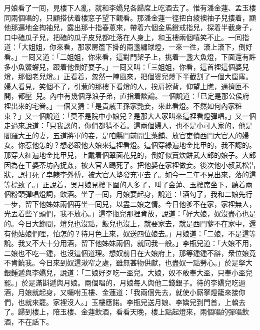 月娘看了一囘，見樓下人亂，就和李嬌兒各歸席上吃酒去了。惟有潘金蓮、孟玉樓同兩個唱的，只顧搭伏着樓窓子望下觀看。那潘金蓮一徑把白綾襖袖子兒摟着，顯他那遍地金掏袖兒，露出那十指春蔥來，帶着六個金馬鐙戒指兒，探着半截身子，口中磕瓜子兒，把磕的瓜子皮兒都吐落在人身上，{}和玉樓兩個嘻笑不止。{}一囘指道：「大姐姐，你來看，那家房簷下掛的兩盞繡球燈，一來一徃，滾上滾下，倒好看。」一囘又道：「二姐姐，你來看，這對門架子上，挑着一盞大魚燈，下面還有許多小魚鱉蠏兒，跟着他倒好耍子。」一囘又叫：「三姐姐，你看，這首裡這個婆兒燈，那個老兒燈。」正看着，忽然一陣風來，把個婆兒燈下半截割了一個大窟窿。{}婦人看見，笑個不了，引惹的那樓下看燈的人，挨肩擦背，仰望上瞧，通擠匝不開，都壓𨇽𨇽兒。內中有幾個浮浪子弟，直指着談論。一個說道：「已定是那公侯府裡出來的宅眷。」一個又猜：「是貴戚王孫家艷妾，來此看燈。不然如何內家粧束？」又一個說道：「莫不是院中小娘兒？是那大人家叫來這裡看燈彈唱。」又一個走過來說道：「只我認的，你們都猜不着。這兩個婦人，也不是小可人家的，他是閻羅大王的妻，五道將軍的妾，是咱縣門前開生藥鋪、放官吏債西門大官人的婦女。你惹他怎的？想必跟他大娘來這裡看燈。這個穿綠遍地金比甲的，我不認的。{}那穿大紅遍地金比甲兒，上戴着個翠面花兒的，倒好似賣炊餅武大郎的娘子。大郎因為在王婆茶坊內捉姦，被大官人踢死了。把他娶在家裡做妾。後次他小叔武松告狀，誤打死了皁隸李外傅，被大官人墊發充軍去了。{}如今一二年不見出來，落的這等標致了。」正說着，吳月娘見樓下圍的人多了，叫了金蓮、玉樓席坐下，聽着兩個粉頭彈唱燈詞，飲酒。坐了一囘，月娘要起身，說道：「酒勾了，我和二娘先行一步，留下他姊妹兩個再坐一囘兒，以盡二娘之情。今日他爹不在家，家裡無人，光丟着些丫頭們，{}我不放心。」這李瓶兒那裡肯放，說道：「好大娘，奴沒盡心也是的。今日大節間，燈兒也沒點，飯兒也沒上，就要家去，就是西門爹不在家中，還有他姑娘們哩，怕怎的？待月色上來，奴送四位娘去。」月娘道：「二娘，不是這等說。我又不大十分用酒，留下他姊妹兩個，就同我一般。」李瓶兒道：「大娘不用，二娘也不吃一鍾，也沒這個道理。想奴前日在大娘府上，那等鍾鍾不辭，衆位娘竟不肯饒我。今日來到奴這湫窄之處，雖無甚物供獻，也盡奴一點勞心。」於是拏大銀鍾遞與李嬌兒，說道：「二娘好歹吃一盃兒。大娘，奴不敢奉大盃，只奉小盃兒罷。」於是滿斟遞與月娘。兩個唱的，月娘每人與他二錢銀子。待的李嬌兒吃過酒，月娘就起身，又囑咐玉樓、金蓮道：「我兩個先去，就使小厮拏燈籠來接你們，也就來罷。家裡沒人。」玉樓應諾。李瓶兒送月娘、李嬌兒到門首，上轎去了。歸到樓上，陪玉樓、金蓮飲酒，看看天晚，樓上點起燈來，兩個唱的彈唱飲酒，不在話下。

